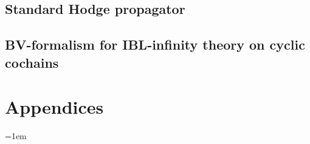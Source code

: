 \documentclass[11pt,
a4paper,
oneside, %
openright, %
cleardoublepage=plain, %
final
]{scrbook}
\providecommand{\MainFolder}{.} %
\providecommand{\SubfilesFolder}{\MainFolder/Subfiles} %
\begin{document}




\chapter{Standard Hodge propagator}
\label{Chap:Prpg}






\chapter{BV-formalism for IBL-infinity theory on cyclic cochains}





%

\part{Appendices}
\appendix






\backmatter

%

\emergencystretch=1em
\printbibliography
\end{document}
